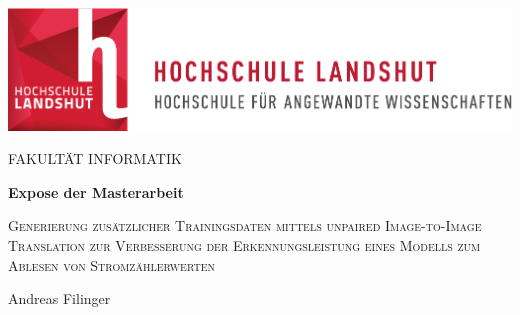 \thispagestyle{empty}
\begin{titlepage}
	\vspace{3cm}



\begin{center}
	\includegraphics[scale=0.8]{Titelseite/hl-logo.pdf}  
\end{center}

\vspace{2.5cm}

\begin{center}
  \Large FAKULTÄT INFORMATIK
\end{center}

\vspace{1cm}
\begin{center}
	\Huge
	\textbf{Expose der Masterarbeit}\\
\end{center}

\vspace{1cm}

\begin{center}
	\Large
	\textsc{Generierung zusätzlicher Trainingsdaten mittels unpaired Image-to-Image Translation zur Verbesserung der Erkennungsleistung eines Modells zum Ablesen von Stromzählerwerten}\\
\end{center}

\vspace{1.5cm}

\begin{center}
	\Large
	Andreas Filinger
\end{center}

\vspace{2cm}	%
\begin{center}
	\large
\end{center}

\end{titlepage}
